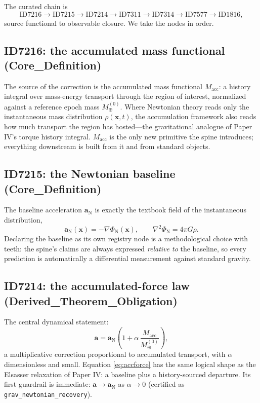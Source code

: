 \documentclass[11pt]{article}
\theoremstyle{remark}
\begin{document}
The curated chain is
\begin{equation*}
\text{ID7216} \to \text{ID7215} \to \text{ID7214} \to \text{ID7311} \to \text{ID7314} \to \text{ID7577} \to \text{ID1816},
\end{equation*}
source functional to observable closure. We take the nodes in order.

\subsection{ID7216: the accumulated mass functional (Core\_Definition)}

The source of the correction is the accumulated mass functional $M_{\mathrm{acc}}$: a history integral over mass-energy transport through the region of interest, normalized against a reference epoch mass $M_\oplus^{(0)}$. Where Newtonian theory reads only the instantaneous mass distribution $\rho(\mathbf{x}, t)$, the accumulation framework also reads how much transport the region has hosted---the gravitational analogue of Paper IV's torque history integral. $M_{\mathrm{acc}}$ is the only new primitive the spine introduces; everything downstream is built from it and from standard objects.

\subsection{ID7215: the Newtonian baseline (Core\_Definition)}

The baseline acceleration $\mathbf{a}_{\mathrm{N}}$ is exactly the textbook field of the instantaneous distribution,
\begin{equation}
\mathbf{a}_{\mathrm{N}}(\mathbf{x}) = -\nabla \Phi_{\mathrm{N}}(\mathbf{x}), \qquad \nabla^2 \Phi_{\mathrm{N}} = 4\pi G \rho.
\end{equation}
Declaring the baseline as its own registry node is a methodological choice with teeth: the spine's claims are always expressed \emph{relative to} the baseline, so every prediction is automatically a differential measurement against standard gravity.

\subsection{ID7214: the accumulated-force law (Derived\_Theorem\_Obligation)}

The central dynamical statement:
\begin{equation}
\mathbf{a} = \mathbf{a}_{\mathrm{N}} \left( 1 + \alpha\, \frac{M_{\mathrm{acc}}}{M_\oplus^{(0)}} \right),
\label{eq:accforce}
\end{equation}
a multiplicative correction proportional to accumulated transport, with $\alpha$ dimensionless and small. Equation \eqref{eq:accforce} has the same logical shape as the Elsasser relaxation of Paper IV: a baseline plus a history-sourced departure. Its first guardrail is immediate: $\mathbf{a} \to \mathbf{a}_{\mathrm{N}}$ as $\alpha \to 0$ (certified as \texttt{grav\_newtonian\_recovery}).
\end{document}
